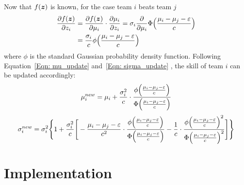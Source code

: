 Now that $f(\bm{z})$ is known, for the case team $i$ beats team $j$
\begin{equation}
\begin{split}
\frac{\partial f(\bm{z})}{\partial z_{i}} &= \frac{\partial f(\bm{z})}{\partial \mu_{i}} \cdot \frac{\partial \mu_{i}}{\partial z_{i}} = \sigma_{i}\frac{\partial}{\partial \mu_{i}}\Phi \Big{(} \frac{\mu_{i} - \mu_{j} - \varepsilon}{c}  \Big{)} \\
&= \frac{\sigma_{i}}{c} \phi \Big{(} \frac{\mu_{i} - \mu_{j} - \varepsilon}{c}  \Big{)}
\end{split}
\end{equation}
where $\phi$ is the standard Gaussian probability density function. Following Equation~\ref{Eqn: mu_update} and~\ref{Eqn: sigma_update} , the skill of team $i$ can be updated accordingly:
\begin{equation}
\mu_{i}^{new} = \mu_{i} + \frac{\sigma_{i}^{2}}{c} \cdot \frac{\phi \Big{(} \frac{\mu_{i} - \mu_{j} - \varepsilon}{c}  \Big{)}}{\Phi \Big{(} \frac{\mu_{i} - \mu_{j} - \varepsilon}{c}  \Big{)}}
\end{equation}
\begin{equation}
\sigma_{i}^{new} = \sigma_{i}^{2} 
\Bigg{\{} 
1 + \frac{\sigma_{i}^{2}}{c} 
\Bigg{[} 
-\frac{\mu_{i} - \mu_{j} - \varepsilon}{c^{2}} \cdot \frac{\phi \Big{(} \frac{\mu_{i} - \mu_{j} - \varepsilon}{c}  \Big{)}}{\Phi \Big{(} \frac{\mu_{i} - \mu_{j} - \varepsilon}{c}  \Big{)}}
-\frac{1}{c} \cdot  \frac{\phi \Big{(} \frac{\mu_{i} - \mu_{j} - \varepsilon}{c}  \Big{)}^{2}}{\Phi \Big{(} \frac{\mu_{i} - \mu_{j} - \varepsilon}{c}
 \Big{)}^{2}}
\Bigg{]}
\Bigg{\}}
\end{equation}

\section{Implementation}\label{Sec: imp}